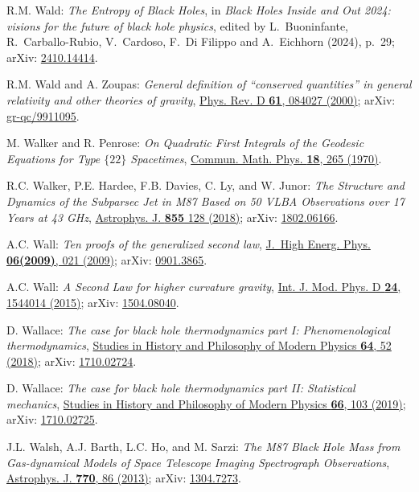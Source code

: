 \begin{thebibliography}{123}
R.M. Wald: {\em The Entropy of Black Holes},
in {\em Black Holes Inside and Out 2024: visions for the future of black hole physics},
edited by L.~Buoninfante, R.~Carballo-Rubio, V.~Cardoso, F.~Di Filippo and A.~Eichhorn
(2024), p.~29;
arXiv: \href{https://arxiv.org/abs/2410.14414}{2410.14414}.

R.M. Wald and A. Zoupas:
{\em General definition of ``conserved quantities'' in general relativity and other theories of gravity},
\href{https://doi.org/10.1103/PhysRevD.61.084027}{Phys. Rev. D {\bf 61}, 084027 (2000)};
arXiv: \href{https://arxiv.org/abs/gr-qc/9911095}{gr-qc/9911095}.

M. Walker and R. Penrose: {\em On Quadratic First Integrals of the Geodesic Equations
for Type $\{22\}$ Spacetimes},
\href{https://doi.org/10.1007/BF01649445}{Commun. Math. Phys. {\bf 18}, 265 (1970)}.

R.C. Walker, P.E. Hardee, F.B. Davies, C. Ly, and W. Junor:
{\em The Structure and Dynamics of the Subparsec Jet in M87 Based on 50 VLBA Observations over 17 Years at 43 GHz},
\href{https://doi.org/10.3847/1538-4357/aaafcc}{Astrophys. J. {\bf 855} 128 (2018)};
arXiv: \href{https://arxiv.org/abs/1802.06166}{1802.06166}.

A.C. Wall:
{\em Ten proofs of the generalized second law},
\href{https://doi.org/10.1088/1126-6708/2009/06/021}{J.~High Energ. Phys. {\bf 06(2009)}, 021 (2009)};
arXiv: \href{https://arxiv.org/abs/0901.3865}{0901.3865}.

A.C. Wall:
{\em A Second Law for higher curvature gravity},
\href{https://doi.org/10.1142/S0218271815440149}{Int. J. Mod. Phys. D {\bf 24}, 1544014 (2015)};
arXiv: \href{https://arxiv.org/abs/1504.08040}{1504.08040}.

D. Wallace:
{\em The case for black hole thermodynamics part I: Phenomenological thermodynamics},
\href{https://doi.org/10.1016/j.shpsb.2018.05.002}{Studies in History and Philosophy of Modern Physics {\bf 64}, 52 (2018)};
arXiv: \href{https://arxiv.org/abs/1710.02724}{1710.02724}.

D. Wallace:
{\em The case for black hole thermodynamics part II: Statistical mechanics},
\href{https://doi.org/10.1016/j.shpsb.2018.10.006}{Studies in History and Philosophy of Modern Physics {\bf 66}, 103 (2019)};
arXiv: \href{https://arxiv.org/abs/1710.02725}{1710.02725}.

J.L. Walsh, A.J. Barth, L.C. Ho, and M. Sarzi:
{\em The M87 Black Hole Mass from Gas-dynamical Models of Space Telescope Imaging Spectrograph Observations},
\href{https://doi.org/10.1088/0004-637X/770/2/86}{Astrophys. J. {\bf 770}, 86 (2013)};
arXiv: \href{https://arxiv.org/abs/1304.7273}{1304.7273}.


\end{thebibliography}
